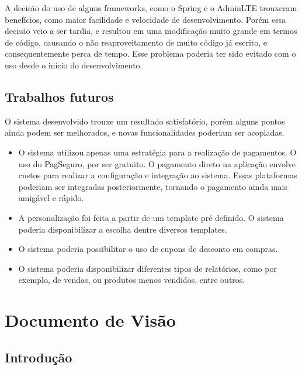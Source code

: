 \documentclass[a4paper,12pt]{monografia}
\begin{document}
A decisão do uso de alguns frameworks, como o Spring e o AdminLTE trouxeram benefícios, como maior facilidade e velocidade de desenvolvimento. Porém essa decisão veio a ser tardia, e resultou em uma modificação muito grande em termos de código, causando o não reaproveitamento de muito código já escrito, e consequentemente perca de tempo. Esse problema poderia ter sido evitado com o uso desde o início do desenvolvimento.

\section{Trabalhos futuros} %
\label{sec:trabalhos_futuros}

O sistema desenvolvido trouxe um resultado satisfatório, porém alguns pontos ainda podem ser melhorados, e  novas funcionalidades poderiam ser acopladas.

\begin{itemize}
	\item O sistema utilizou apenas uma estratégia para a realização de pagamentos. O uso do PagSeguro, por ser gratuito. O pagamento direto na aplicação envolve custos para realizar a configuração e integração ao sistema. Essas plataformas poderiam ser integradas posteriormente, tornando o pagamento ainda mais amigável e rápido.
	\item A personalização foi feita a partir de um template pré definido. O sistema poderia disponibilizar a escolha dentre diversos templates.
	\item O sistema poderia possibilitar o uso de cupons de desconto em compras.
	\item O sistema poderia disponibilizar diferentes tipos de relatórios, como por exemplo, de vendas, ou produtos menos vendidos, entre outros.
\end{itemize}




\appendix
\newpage
{}
{}  
\chapter{Documento de Visão}
\label{ap:documento_visao}
\section{Introdução} %
\label{sec:Introducao}
\end{document}
